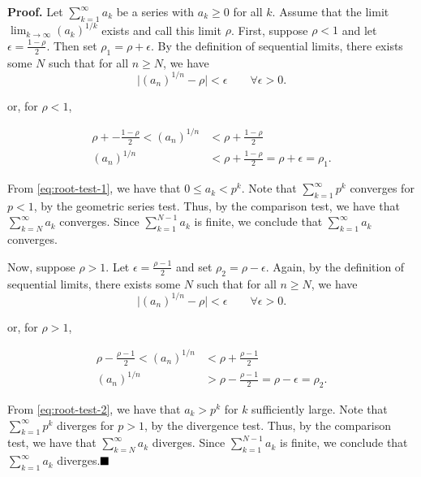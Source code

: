 \documentclass[12pt]{article}
\begin{document}
\noindent\textbf{Proof.} Let \(\sum_{k=1}^{\infty} a_k\) be a series with \(a_k \geq 0\) for all \(k\). Assume that the limit \(\lim_{k \to \infty} (a_k)^{1/k}\) exists and call this limit \(\rho\). First, suppose \(\rho < 1\) and let \(\epsilon = \frac{1-\rho}{2}\). Then set \(\rho_1 = \rho + \epsilon\). By the definition of sequential limits, there exists some \(N\) such that for all \(n \geq N\), we have
\begin{equation}
    \vert (a_n)^{1/n} - \rho \vert < \epsilon \qquad \forall \epsilon > 0.
\end{equation}

\noindent or, for \(\rho < 1\),

\begin{align}
    \rho + -\frac{1-\rho}{2} < (a_n)^{1/n} &< \rho + \frac{1-\rho}{2} \\
    (a_n)^{1/n} &< \rho + \frac{1-\rho}{2} = \rho + \epsilon = \rho_1.\label{eq:root-test-1}
\end{align}

From \eqref{eq:root-test-1}, we have that \(0 \leq a_k < p^k\). Note that \(\sum_{k=1}^{\infty} p^k\) converges for \(p < 1\), by the geometric series test. Thus, by the comparison test, we have that \(\sum_{k=N}^{\infty} a_k\) converges. Since \(\sum_{k=1}^{N-1} a_k\) is finite, we conclude that \(\sum_{k=1}^{\infty} a_k\) converges.

Now, suppose \(\rho > 1\). Let \(\epsilon = \frac{\rho - 1}{2}\) and set \(\rho_2 = \rho - \epsilon\). Again, by the definition of sequential limits, there exists some \(N\) such that for all \(n \geq N\), we have
\begin{equation}
    \vert (a_n)^{1/n} - \rho \vert < \epsilon \qquad \forall \epsilon > 0.
\end{equation}

\noindent or, for \(\rho > 1\),

\begin{align}
    \rho - \frac{\rho - 1}{2} < (a_n)^{1/n} &< \rho + \frac{\rho - 1}{2} \\
    (a_n)^{1/n} &> \rho - \frac{\rho - 1}{2} = \rho - \epsilon = \rho_2.\label{eq:root-test-2}
\end{align}

From \eqref{eq:root-test-2}, we have that \(a_k > p^k\) for \(k\) sufficiently large. Note that \(\sum_{k=1}^{\infty} p^k\) diverges for \(p > 1\), by the divergence test. Thus, by the comparison test, we have that \(\sum_{k=N}^{\infty} a_k\) diverges. Since \(\sum_{k=1}^{N-1} a_k\) is finite, we conclude that \(\sum_{k=1}^{\infty} a_k\) diverges.$\hfill\blacksquare$
\end{document}
